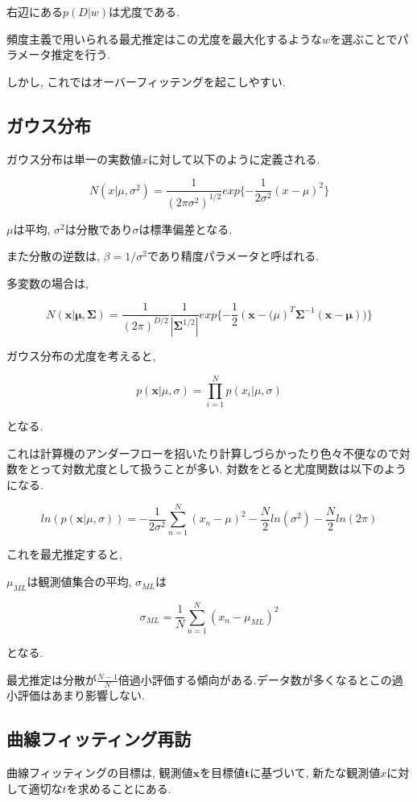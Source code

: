 右辺にある$p(D|w)$は尤度である.

頻度主義で用いられる最尤推定はこの尤度を最大化するような$w$を選ぶことでパラメータ推定を行う.

しかし, これではオーバーフィッテングを起こしやすい.

\subsection{ガウス分布}

ガウス分布は単一の実数値$x$に対して以下のように定義される.

$$ N(x|\mu, \sigma^2) = \frac{1}{(2\pi\sigma^2)^{1/2}}exp\{ -\frac{1}{2\sigma^2}(x-\mu)^2 \} $$

$\mu$は平均, $\sigma^2$は分散であり$\sigma$は標準偏差となる.

また分散の逆数は, $\beta = 1/\sigma^2$であり精度パラメータと呼ばれる.

多変数の場合は,

$$ N(\bm{x}|\bm{\mu}, \bm{\Sigma}) = \frac{1}{(2\pi)^{D/2}}\frac{1}{|\bm{\Sigma}^{1/2}|}exp\{ -\frac{1}{2}(\bm{x} - \bm(\mu)^T\bm{\Sigma}^{-1}(\bm{x} - \bm{\mu})) \} $$

ガウス分布の尤度を考えると, 

$$ p(\bm{x}|\mu, \sigma) = \prod_{i=1}^N p(x_i | \mu, \sigma) $$

となる.

これは計算機のアンダーフローを招いたり計算しづらかったり色々不便なので対数をとって対数尤度として扱うことが多い. 対数をとると尤度関数は以下のようになる.

$$ ln(p(\bm{x}|\mu, \sigma)) = -\frac{1}{2\sigma^2}\sum^N_{n=1}(x_n-\mu)^2 - \frac{N}{2}ln(\sigma^2) - \frac{N}{2}ln(2\pi) $$

これを最尤推定すると,

$\mu_{ML}$は観測値集合の平均, $\sigma_{ML}$は

$$ \sigma_{ML} = \frac{1}{N}\sum_{n=1}^{N}(x_n - \mu_{ML})^2 $$

となる.

最尤推定は分散が$\frac{N-1}{N}$倍過小評価する傾向がある.データ数が多くなるとこの過小評価はあまり影響しない.

\subsection{曲線フィッティング再訪}

曲線フィッティングの目標は, 観測値$\bm{x}$を目標値$\bm{t}$に基づいて, 新たな観測値$x$に対して適切な$t$を求めることにある.

